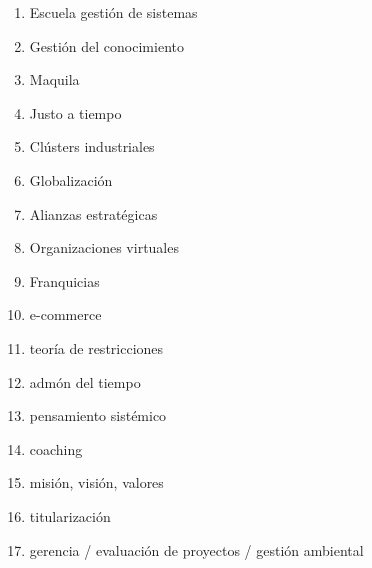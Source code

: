 \documentclass[letterpaper,12pt]{article}
\begin{document}
\begin{sloppypar}
\begin{enumerate}
    \item Escuela gestión de sistemas
    \item Gestión del conocimiento 
    \item Maquila 
    \item Justo a tiempo 
    \item Clústers industriales 
    \item Globalización 
    \item Alianzas estratégicas 
    \item Organizaciones virtuales 
    \item Franquicias
    \item e-commerce 
    \item teoría de restricciones 
    \item admón del tiempo 
    \item pensamiento sistémico 
    \item coaching 
    \item misión, visión, valores 
    \item titularización 
    \item gerencia / evaluación de proyectos / gestión ambiental 
\end{enumerate}
\end{sloppypar}
\end{document}
